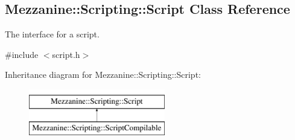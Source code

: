 \hypertarget{classMezzanine_1_1Scripting_1_1Script}{
\subsection{Mezzanine::Scripting::Script Class Reference}
\label{classMezzanine_1_1Scripting_1_1Script}
}


The interface for a script.  




{\ttfamily \#include $<$script.h$>$}

Inheritance diagram for Mezzanine::Scripting::Script:\begin{figure}[H]
\begin{center}
\leavevmode
\includegraphics[height=2.000000cm]{classMezzanine_1_1Scripting_1_1Script}
\end{center}
\end{figure}
